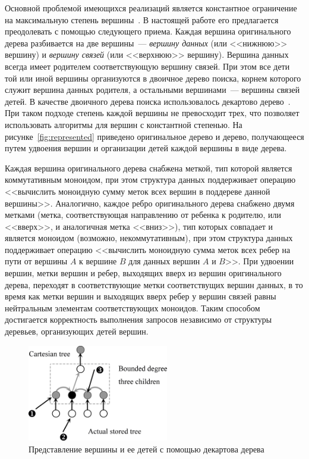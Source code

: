 \documentclass[specification,annotation]{itmo-student-thesis}
\begin{document}
Основной проблемой имеющихся реализаций является константное ограничение на максимальную степень вершины~\cite{acar04}. В настоящей работе его предлагается преодолевать
с помощью следующего приема. Каждая вершина оригинального дерева разбивается на две вершины~--- \emph{вершину данных} (или <<нижнюю>> вершину) и \emph{вершину связей} (или <<верхнюю>> вершину).
Вершина данных всегда имеет родителем соответствующую вершину связей. При этом все дети той или иной вершины организуются в двоичное дерево поиска, корнем которого служит вершина данных родителя, а
остальными вершинами~--- вершины связей детей. В качестве двоичного дерева поиска использовалось декартово дерево~\cite{cartesian-tree}. При таком подходе степень каждой вершины не превосходит трех, что
позволяет использовать алгоритмы для вершин с константной степенью. На рисунке~\ref{fig:represented} приведено оригинальное дерево и дерево, получающееся путем удвоения вершин и организации детей каждой
вершины в виде дерева.

Каждая вершина оригинального дерева снабжена меткой, тип которой является коммутативным моноидом, при этом структура данных поддерживает операцию <<вычислить моноидную сумму меток всех вершин в поддереве
данной вершины>>. Аналогично, каждое ребро оригинального дерева снабжено двумя метками (метка, соответствующая направлению от ребенка к родителю, или <<вверх>>, и аналогичная метка <<вниз>>),
тип которых совпадает и является моноидом (возможно, некоммутативным), при этом структура данных поддерживает операцию <<вычислить моноидную сумма меток всех ребер на пути от вершины $A$
к вершине $B$ для данных вершин $A$ и $B$>>. При удвоении вершин, метки вершин и ребер, выходящих вверх из вершин оригинального дерева, переходят в соответствующие метки соответствущих вершин данных,
в то время как метки вершин и выходящих вверх ребер у вершин связей равны нейтральным элементам соответствующих моноидов. Таким способом достигается корректность выполнения запросов независимо от
структуры деревьев, организующих детей вершин.

\begin{figure}[!ht]
\centering
\includegraphics[width=0.55\textwidth]{pic/Cartesian_tree.png}
\caption{Представление вершины и ее детей с помощью декартова дерева}\label{fig:cartesian-children}
\end{figure}
\end{document}

